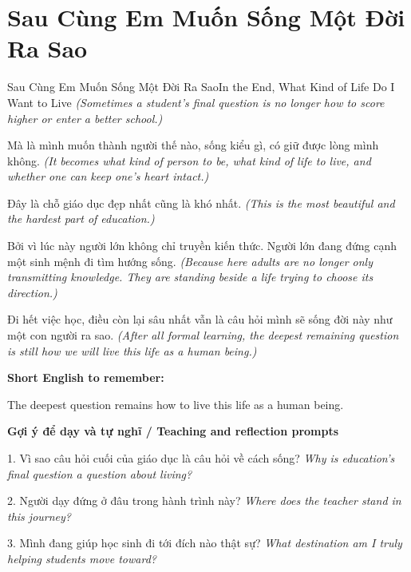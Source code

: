 \section{Sau Cùng Em Muốn Sống Một Đời Ra Sao}
\begin{truyen}{Sau Cùng Em Muốn Sống Một Đời Ra Sao}{In the End, What Kind of Life Do I Want to Live}
\textit{(Sometimes a student's final question is no longer how to score higher or enter a better school.)}

Mà là mình muốn thành người thế nào, sống kiểu gì, có giữ được lòng mình không.
\textit{(It becomes what kind of person to be, what kind of life to live, and whether one can keep one's heart intact.)}

Đây là chỗ giáo dục đẹp nhất cũng là khó nhất.
\textit{(This is the most beautiful and the hardest part of education.)}

Bởi vì lúc này người lớn không chỉ truyền kiến thức. Người lớn đang đứng cạnh một sinh mệnh đi tìm hướng sống.
\textit{(Because here adults are no longer only transmitting knowledge. They are standing beside a life trying to choose its direction.)}

\end{truyen}

\begin{baihoc}
Đi hết việc học, điều còn lại sâu nhất vẫn là câu hỏi mình sẽ sống đời này như một con người ra sao.
\textit{(After all formal learning, the deepest remaining question is still how we will live this life as a human being.)}
\end{baihoc}

\begin{ghinhoanh}
\textbf{Short English to remember:}

The deepest question remains how to live this life as a human being.

\end{ghinhoanh}

\begin{tuhocnhanh}
\textbf{Gợi ý để dạy và tự nghĩ / Teaching and reflection prompts}

1. Vì sao câu hỏi cuối của giáo dục là câu hỏi về cách sống? \textit{Why is education's final question a question about living?}

2. Người dạy đứng ở đâu trong hành trình này? \textit{Where does the teacher stand in this journey?}

3. Mình đang giúp học sinh đi tới đích nào thật sự? \textit{What destination am I truly helping students move toward?}
\end{tuhocnhanh}
\ngancach

